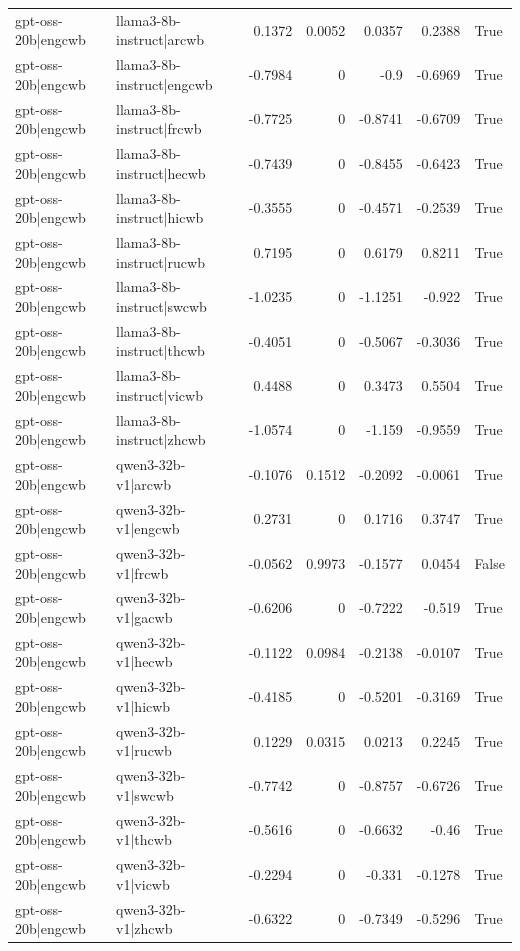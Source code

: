 \begin{table}
\begin{tabular}{l l r r r r l}
gpt-oss-20b|engcwb & llama3-8b-instruct|arcwb & 0.1372 & 0.0052 & 0.0357 & 0.2388 & True \\
gpt-oss-20b|engcwb & llama3-8b-instruct|engcwb & -0.7984 & 0 & -0.9 & -0.6969 & True \\
gpt-oss-20b|engcwb & llama3-8b-instruct|frcwb & -0.7725 & 0 & -0.8741 & -0.6709 & True \\
gpt-oss-20b|engcwb & llama3-8b-instruct|hecwb & -0.7439 & 0 & -0.8455 & -0.6423 & True \\
gpt-oss-20b|engcwb & llama3-8b-instruct|hicwb & -0.3555 & 0 & -0.4571 & -0.2539 & True \\
gpt-oss-20b|engcwb & llama3-8b-instruct|rucwb & 0.7195 & 0 & 0.6179 & 0.8211 & True \\
gpt-oss-20b|engcwb & llama3-8b-instruct|swcwb & -1.0235 & 0 & -1.1251 & -0.922 & True \\
gpt-oss-20b|engcwb & llama3-8b-instruct|thcwb & -0.4051 & 0 & -0.5067 & -0.3036 & True \\
gpt-oss-20b|engcwb & llama3-8b-instruct|vicwb & 0.4488 & 0 & 0.3473 & 0.5504 & True \\
gpt-oss-20b|engcwb & llama3-8b-instruct|zhcwb & -1.0574 & 0 & -1.159 & -0.9559 & True \\
gpt-oss-20b|engcwb & qwen3-32b-v1|arcwb & -0.1076 & 0.1512 & -0.2092 & -0.0061 & True \\
gpt-oss-20b|engcwb & qwen3-32b-v1|engcwb & 0.2731 & 0 & 0.1716 & 0.3747 & True \\
gpt-oss-20b|engcwb & qwen3-32b-v1|frcwb & -0.0562 & 0.9973 & -0.1577 & 0.0454 & False \\
gpt-oss-20b|engcwb & qwen3-32b-v1|gacwb & -0.6206 & 0 & -0.7222 & -0.519 & True \\
gpt-oss-20b|engcwb & qwen3-32b-v1|hecwb & -0.1122 & 0.0984 & -0.2138 & -0.0107 & True \\
gpt-oss-20b|engcwb & qwen3-32b-v1|hicwb & -0.4185 & 0 & -0.5201 & -0.3169 & True \\
gpt-oss-20b|engcwb & qwen3-32b-v1|rucwb & 0.1229 & 0.0315 & 0.0213 & 0.2245 & True \\
gpt-oss-20b|engcwb & qwen3-32b-v1|swcwb & -0.7742 & 0 & -0.8757 & -0.6726 & True \\
gpt-oss-20b|engcwb & qwen3-32b-v1|thcwb & -0.5616 & 0 & -0.6632 & -0.46 & True \\
gpt-oss-20b|engcwb & qwen3-32b-v1|vicwb & -0.2294 & 0 & -0.331 & -0.1278 & True \\
gpt-oss-20b|engcwb & qwen3-32b-v1|zhcwb & -0.6322 & 0 & -0.7349 & -0.5296 & True \\

\end{tabular}
\end{table}
